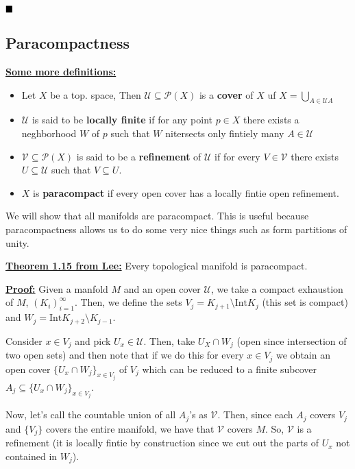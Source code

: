 \documentclass{article}
\newcommand{\qedsymbol}{\hfill\blacksquare}
\begin{document}
$\qedsymbol$

\vskip 1cm
\subsection{Paracompactness}

\vskip 0.5cm
\underline{\textbf{Some more definitions:}} 
\begin{itemize}
  \item Let $X$ be a top. space, Then $\mathcal U \subseteq \mathcal P (X)$ is a \textbf{cover} of $X$ uf $X = \bigcup_{A \in \mathcal{U} A}$
  \item $\mathcal U$ is said to be \textbf{locally finite} if for any point $p \in X$ there exists a neghborhood $W$ of $p$ such that $W$ nitersects only fintiely many $A \in \mathcal U$
  \item $\mathcal V \subseteq \mathcal P(X)$ is said to be a \textbf{refinement} of $\mathcal{U}$ if for every $V \in \mathcal V$ there exists $U \subseteq \mathcal U$ such that $V \subseteq U$.
  \item $X$ is \textbf{paracompact} if every open cover has a locally fintie open refinement.
\end{itemize}

\vskip 0.5cm
We will show that all manifolds are paracompact. This is useful because paracompactness allows us to do some very nice things such as form partitions of unity.

\vskip 1cm
\underline{\textbf{Theorem 1.15 from Lee:}} Every topological manifold is paracompact. 

\vskip 0.5cm
\underline{\textbf{Proof:}} Given a manfold $M$ and an open cover $\mathcal U$, we take a compact exhaustion of $M$, $(K_i)_{i = 1}^{\infty}$. Then, we define the sets $V_j = K_{j+1} \setminus \text{Int} K_j$ (this set is compact) and $W_j = \text{Int} K_{j+2} \setminus K_{j-1}$.

\vskip 0.5cm
Consider $x \in V_j$ and pick $U_x \in \mathcal U$. Then, take $U_X \cap W_j$ (open since intersection of two open sets) and then note that if we do this for every $x \in V_j$ we obtain an open cover $\{ U_x \cap W_j \}_{x \in V_j}$ of $V_j$ which can be reduced to a finite subcover $A_j \subseteq \{ U_x \cap W_j \}_{x \in V_j}$.

\vskip 0.5cm
Now, let's call the countable union of all $A_j$'s as $\mathcal V$. Then, since each $A_j$ covers $V_j$ and $\{V_j\}$ covers the entire manifold, we have that $\mathcal V$ covers $M$. So, $\mathcal V$ is a refinement (it is locally fintie by construction since we cut out the parts of $U_x$ not contained in $W_j$).
\end{document}
